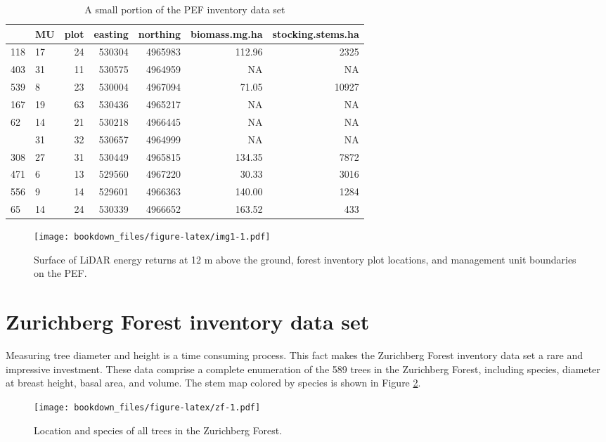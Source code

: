 \documentclass[]{krantz}
\theoremstyle{definition}
\theoremstyle{definition}
\theoremstyle{definition}
\theoremstyle{remark}
\begin{document}
\begin{table}

\caption{\label{tab:pef}A small portion of the PEF inventory data set}
\centering
\begin{tabular}[t]{llrrrrr}
\toprule
  & MU & plot & easting & northing & biomass.mg.ha & stocking.stems.ha\\
\midrule
118 & 17 & 24 & 530304 & 4965983 & 112.96 & 2325\\
403 & 31 & 11 & 530575 & 4964959 & NA & NA\\
539 & 8 & 23 & 530004 & 4967094 & 71.05 & 10927\\
167 & 19 & 63 & 530436 & 4965217 & NA & NA\\
62 & 14 & 21 & 530218 & 4966445 & NA & NA\\
\addlinespace
410 & 31 & 32 & 530657 & 4964999 & NA & NA\\
308 & 27 & 31 & 530449 & 4965815 & 134.35 & 7872\\
471 & 6 & 13 & 529560 & 4967220 & 30.33 & 3016\\
556 & 9 & 14 & 529601 & 4966363 & 140.00 & 1284\\
65 & 14 & 24 & 530339 & 4966652 & 163.52 & 433\\
\bottomrule
\end{tabular}
\end{table}

\begin{figure}
\centering
\texttt{[image: bookdown\_files/figure-latex/img1-1.pdf]}
\caption{\label{fig:img1}Surface of LiDAR energy returns at 12 m above the
ground, forest inventory plot locations, and management unit boundaries
on the PEF.}
\end{figure}

\section{Zurichberg Forest inventory data set}\label{zf}

Measuring tree diameter and height is a time consuming process. This
fact makes the Zurichberg Forest inventory data set a rare and
impressive investment. These data comprise a complete enumeration of the
589 trees in the Zurichberg Forest, including species, diameter at
breast height, basal area, and volume. The stem map colored by species
is shown in Figure \ref{fig:zf}.

\begin{figure}
\centering
\texttt{[image: bookdown\_files/figure-latex/zf-1.pdf]}
\caption{\label{fig:zf}Location and species of all trees in the Zurichberg
Forest.}
\end{figure}
\end{document}
